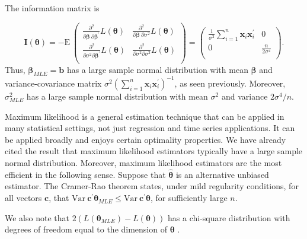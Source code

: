 The information matrix is

\begin{equation*}
\mathbf{I}(\boldsymbol \theta) = -\mathrm{E~} \left(
  \begin{array}{cc}
   \frac{ \partial^2}{\partial
\boldsymbol \beta ~\partial \boldsymbol \beta^{\prime}} L(\boldsymbol
\theta) & \frac{ \partial^2}{\partial
\boldsymbol \beta ~\partial \sigma^2} L(\boldsymbol \theta) \\
   \frac{ \partial^2}{\partial \sigma^2 \partial
\boldsymbol \beta^{\prime} } L(\boldsymbol \theta) & \frac{
\partial^2}{\partial
\sigma^2 \partial \sigma^2} L(\boldsymbol \theta)\\
  \end{array}
  \right)=
  \left(
  \begin{array}{cc}
   \frac{ 1}{\sigma^2} \sum_{i=1}^n \mathbf{x}_i
\mathbf{x}_i^{\prime} & 0 \\
   0 & \frac{n}{2 \sigma^4}\\
  \end{array}
  \right).
\end{equation*}
Thus, $\boldsymbol \beta_{MLE} = \mathbf{b}$ has a large sample
normal distribution with mean $\boldsymbol \beta$ and
variance-covariance matrix $\sigma^2 \left(\sum_{i=1}^n \mathbf{x}_i
\mathbf{x}_i^{\prime} \right)^{-1}$, as seen previously. Moreover,
$\sigma^2_{MLE}$ has a large sample normal distribution with mean
$\sigma^2$ and variance $2 \sigma^4 /n.$


\linejed

Maximum likelihood is a general estimation technique that can be
applied in many statistical settings, not just regression and time
series applications. It can be applied broadly and
enjoys certain optimality properties. We have already cited the
result that maximum likelihood estimators typically have a large
sample normal distribution. Moreover, maximum likelihood estimators
are the most efficient in the following sense. Suppose that
$\widehat{\boldsymbol \theta}$ is an alternative unbiased estimator.
The Cramer-Rao theorem states, under mild regularity conditions, for
all vectors $\mathbf c$, that $ \mathrm{Var~} \mathbf c^{\prime}
\boldsymbol \theta_{MLE} \leq \mathrm{Var~} \mathbf c^{\prime}
\widehat{\boldsymbol \theta}$, for sufficiently large $n$.


We also note that  $2 \left( L(\boldsymbol \theta_{MLE}) -
L(\boldsymbol \theta) \right)$  has a chi-square distribution with
degrees of freedom equal to the dimension of $\boldsymbol \theta$ .

